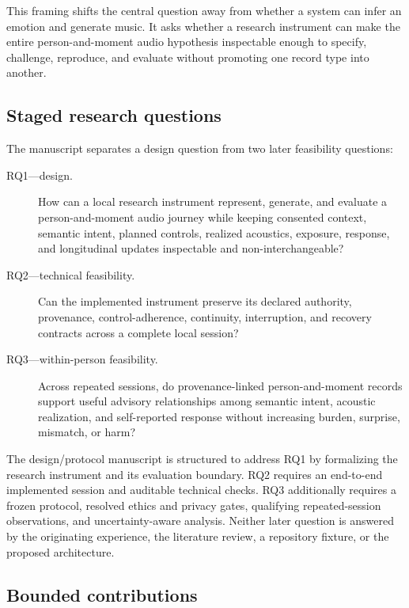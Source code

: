 This framing shifts the central question away from whether a system can infer
an emotion and generate music. It asks whether a research instrument can make
the entire person-and-moment audio hypothesis inspectable enough to specify,
challenge, reproduce, and evaluate without promoting one record type into
another.

\subsection{Staged research questions}
\label{sec:staged-research-questions}

The manuscript separates a design question from two later feasibility
questions:

\begin{description}
  \item[RQ1---design.] How can a local research instrument represent,
    generate, and evaluate a person-and-moment audio journey while keeping
    consented context, semantic intent, planned controls, realized acoustics,
    exposure, response, and longitudinal updates inspectable and
    non-interchangeable?

  \item[RQ2---technical feasibility.] Can the implemented instrument preserve
    its declared authority, provenance, control-adherence, continuity,
    interruption, and recovery contracts across a complete local session?

  \item[RQ3---within-person feasibility.] Across repeated sessions, do
    provenance-linked person-and-moment records support useful advisory
    relationships among semantic intent, acoustic realization, and
    self-reported response without increasing burden, surprise, mismatch, or
    harm?
\end{description}

The design/protocol manuscript is structured to address RQ1 by formalizing the
research instrument and its evaluation boundary. RQ2 requires an end-to-end
implemented session and auditable technical checks. RQ3 additionally requires
a frozen protocol, resolved ethics and privacy gates, qualifying
repeated-session observations, and uncertainty-aware analysis. Neither later
question is answered by the originating experience, the literature review, a
repository fixture, or the proposed architecture.

\subsection{Bounded contributions}
\label{sec:introduction-contributions}

